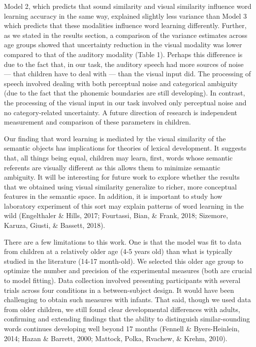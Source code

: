 \documentclass[english,,man,floatsintext]{apa6}
\theoremstyle{definition}
\theoremstyle{definition}
\theoremstyle{definition}
\theoremstyle{remark}
\begin{document}
Model 2, which predicts that sound similarity and visual similarity
influence word learning accuracy in the same way, explained slightly
less variance than Model 3 which predicts that these modalities
influence word learning differently. Further, as we stated in the
results section, a comparison of the variance estimates across age
groups showed that uncertainty reduction in the visual modality was
lower compared to that of the auditory modality (Table 1). Perhaps this
difference is due to the fact that, in our task, the auditory speech had
more sources of noise --- that children have to deal with --- than the
visual input did. The processing of speech involved dealing with both
perceptual noise and categorical ambiguity (due to the fact that the
phonemic boundaries are still developing). In contrast, the processing
of the visual input in our task involved only perceptual noise and no
category-related uncertainty. A future direction of research is
independent measurement and comparison of these parameters in children.

Our finding that word learning is mediated by the visual similarity of
the semantic objects has implications for theories of lexical
development. It suggests that, all things being equal, children may
learn, first, words whose semantic referents are visually different as
this allows them to minimize semantic ambiguity. It will be interesting
for future work to explore whether the results that we obtained using
visual similarity generalize to richer, more conceptual features in the
semantic space. In addition, it is important to study how laboratory
experiment of this sort may explain patterns of word learning in the
wild (Engelthaler \& Hills, 2017; Fourtassi, Bian, \& Frank, 2018;
Sizemore, Karuza, Giusti, \& Bassett, 2018).

There are a few limitations to this work. One is that the model was fit
to data from children at a relatively older age (4-5 years old) than
what is typically studied in the literature (14-17 month-old). We
selected this older age group to optimize the number and precision of
the experimental measures (both are crucial to model fitting). Data
collection involved presenting participants with several trials across
four conditions in a between-subject design. It would have been
challenging to obtain such measures with infants. That said, though we
used data from older children, we still found clear developmental
differences with adults, confirming and extending findings that the
ability to distinguish similar-sounding words continues developing well
beyond 17 months (Fennell \& Byers-Heinlein, 2014; Hazan \& Barrett,
2000; Mattock, Polka, Rvachew, \& Krehm, 2010).
\end{document}

